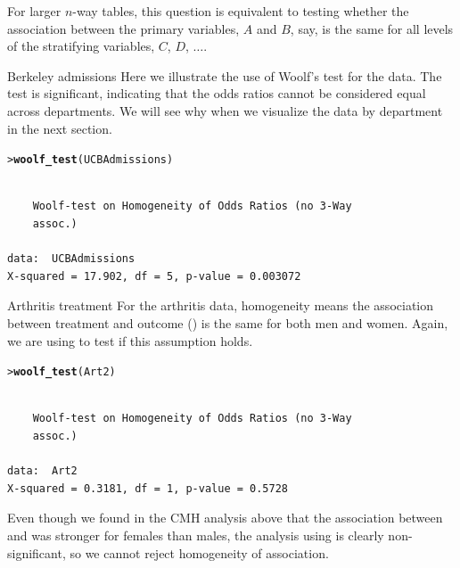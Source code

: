 \documentclass[10pt,krantz2]{krantz}\usepackage[]{graphicx}\usepackage[]{color}
\makeatletter
\newcommand{\hlstd}[1]{\textcolor[rgb]{0.345,0.345,0.345}{#1}}%
\newcommand{\hlkwd}[1]{\textcolor[rgb]{0.737,0.353,0.396}{\textbf{#1}}}%
\newenvironment{kframe}{%
 \def\at@end@of@kframe{}%
 \ifinner\ifhmode%
  \def\at@end@of@kframe{\end{minipage}}%
  \begin{minipage}{\columnwidth}%
 \fi\fi%
 \def\FrameCommand##1{\hskip\@totalleftmargin \hskip-\fboxsep
 \colorbox{shadecolor}{##1}\hskip-\fboxsep
     \hskip-\linewidth \hskip-\@totalleftmargin \hskip\columnwidth}%
 \MakeFramed {\advance\hsize-\width
   \@totalleftmargin\z@ \linewidth\hsize
   \@setminipage}}%
 {\par\unskip\endMakeFramed%
 \at@end@of@kframe}
\newenvironment{knitrout}{}{} %
\renewenvironment{knitrout}{\small\renewcommand{\baselinestretch}{.85}}{} %
\makeatother
\begin{document}
For larger $n$-way tables,
this question is equivalent to testing whether the association
between the primary variables, $A$ and $B$, say, is the same for
all levels of the stratifying variables, $C$, $D$, $\dots$.


\begin{Example}[berkeley1a]{Berkeley admissions}
Here we illustrate the use of Woolf's test for the  data.
The test is significant, indicating that the odds ratios cannot be considered
equal across departments.  We will see why when we visualize the data
by department in the next section.
\begin{knitrout}
\color{fgcolor}\begin{kframe}
\begin{alltt}
\hlstd{> }\hlkwd{woolf_test}\hlstd{(UCBAdmissions)}
\end{alltt}
\begin{verbatim}

	Woolf-test on Homogeneity of Odds Ratios (no 3-Way
	assoc.)

data:  UCBAdmissions
X-squared = 17.902, df = 5, p-value = 0.003072
\end{verbatim}
\end{kframe}
\end{knitrout}

\end{Example}
\begin{Example}[arthrit4]{Arthritis treatment}
For the arthritis data, homogeneity means 
the association
between treatment and outcome ()
is the same for both men and women. Again, we are using
 to test if this assumption holds.

\begin{knitrout}
\color{fgcolor}\begin{kframe}
\begin{alltt}
\hlstd{> }\hlkwd{woolf_test}\hlstd{(Art2)}
\end{alltt}
\begin{verbatim}

	Woolf-test on Homogeneity of Odds Ratios (no 3-Way
	assoc.)

data:  Art2
X-squared = 0.3181, df = 1, p-value = 0.5728
\end{verbatim}
\end{kframe}
\end{knitrout}

Even though we found in the CMH analysis above that the
association between  and 
was stronger for females than males, the analysis using
 is clearly non-significant, so we cannot
reject homogeneity of association.
\end{Example}
\end{document}
